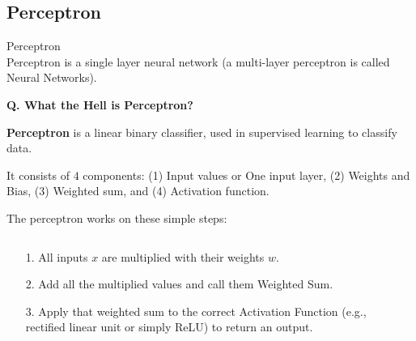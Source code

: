 \subsection{Perceptron}
\begin{transitionsubframe}
  \begin{center}
    \Huge Perceptron\\
    Perceptron is a single layer neural network (a multi-layer
      perceptron is called Neural Networks).
  \end{center}
\end{transitionsubframe}


\begin{frame}[fragile]{\textbf{Q. What the Hell is Perceptron?}}
  \begin{wideitemize}
  \item \textbf{Perceptron} is a linear binary classifier, used in supervised
    learning to classify data.
  \item It consists of $4$ components: (1) Input values or One input layer, (2)
    Weights and Bias, (3) Weighted sum, and (4) Activation function.
  \item The perceptron works on these simple steps:\vspace{0.3em}
  \begin{columns}
    \begin{column}{.5\textwidth}
      {\footnotesize
      \begin{itemize}
      \item[1.] All inputs $x$ are multiplied with their weights $w$.
      \item[2.] Add all the multiplied values and call them Weighted Sum.
      \item[3.] Apply that weighted sum to the correct Activation Function (e.g.,
        rectified linear unit or simply ReLU) to return an output.
      \end{itemize}
      }
    \end{column}

    \begin{column}{.6\textwidth}
    \end{column}
  \end{columns}
  \end{wideitemize}
\end{frame}


